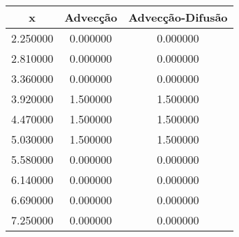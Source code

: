 \begin{tabular}{ccc}
\toprule
x & Advecção & Advecção-Difusão \\
\midrule
2.250000 & 0.000000 & 0.000000 \\
2.810000 & 0.000000 & 0.000000 \\
3.360000 & 0.000000 & 0.000000 \\
3.920000 & 1.500000 & 1.500000 \\
4.470000 & 1.500000 & 1.500000 \\
5.030000 & 1.500000 & 1.500000 \\
5.580000 & 0.000000 & 0.000000 \\
6.140000 & 0.000000 & 0.000000 \\
6.690000 & 0.000000 & 0.000000 \\
7.250000 & 0.000000 & 0.000000 \\
\bottomrule
\end{tabular}

